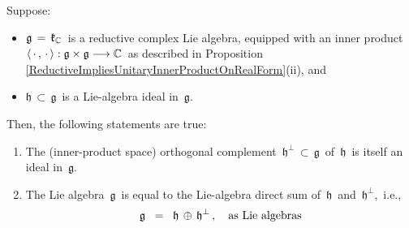 
\vskip 0.5cm
\begin{proposition}
\label{ReductiveImpliesOrthogonalComplementsOfIdealsExist}
\mbox{}
\vskip 0.1cm
\noindent
Suppose:
\begin{itemize}
\item
    $\mathfrak{g} \,=\, \mathfrak{k}_{\mathbb{C}}$\,
    is a {\color{red}reductive} complex Lie algebra, equipped with an inner product
    \,$\langle\,\cdot\,,\,\cdot\,\rangle : \mathfrak{g} \times \mathfrak{g} \longrightarrow \mathbb{C}$\,
    as described in Proposition \ref{ReductiveImpliesUnitaryInnerProductOnRealForm}(ii), and
\item
    $\mathfrak{h} \,\subset\, \mathfrak{g}$\, is a Lie-algebra ideal in \,$\mathfrak{g}$.\,
\end{itemize}
Then, the following statements are true:
\begin{enumerate}
\item
    The (inner-product space) orthogonal complement
    \,$\mathfrak{h}^{\perp} \,\subset\, \mathfrak{g}$\,
    of \,$\mathfrak{h}$\, is itself an ideal in \,$\mathfrak{g}$.
\item
    The Lie algebra \,$\mathfrak{g}$\, is equal to the Lie-algebra direct sum of
    \,$\mathfrak{h}$\, and \,$\mathfrak{h}^{\perp}$,\, i.e.,
    \begin{equation*}
    \mathfrak{g}
    \;\; = \;\;
        \mathfrak{h} \,\oplus\, \mathfrak{h}^{\perp}\,,
    \quad
    \textnormal{as Lie algebras}
    \end{equation*}
\end{enumerate}
\end{proposition}
\proof
